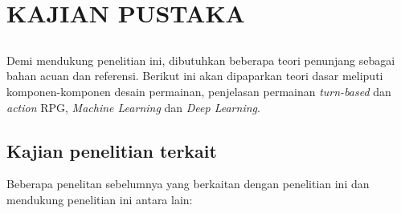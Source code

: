 \chapter{KAJIAN PUSTAKA}
\label{chap:chap2_kajian_pustaka}

\section*{}
Demi mendukung penelitian ini, dibutuhkan beberapa teori penunjang sebagai bahan acuan dan referensi. Berikut ini akan dipaparkan teori dasar meliputi komponen-komponen desain permainan, penjelasan permainan \textit{turn-based} dan \textit{action} RPG, \textit{Machine Learning} dan \textit{Deep Learning}.
\vspace{1ex}

\section{Kajian penelitian terkait}
\label{sec:sec2_kajian}
\vspace{1ex}

Beberapa penelitan sebelumnya yang berkaitan dengan penelitian ini dan mendukung penelitian ini antara lain:

